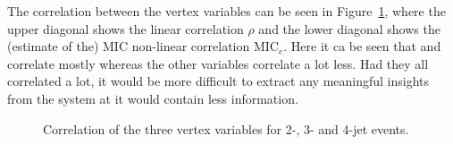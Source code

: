 The correlation between the vertex variables can be seen in Figure~\ref{fig:q:correlation_vertex_all}, where the upper diagonal shows the linear correlation $\rho$ and the lower diagonal shows the (estimate of the) MIC non-linear correlation $\mathrm{MIC}_e$. Here it ca be seen that  and  correlate mostly whereas the other variables correlate a lot less. Had they all correlated a lot, it would be more difficult to extract any meaningful insights from the system at it would contain less information. 

\begin{figure}%
  \centering
  \;
  \caption[Correlation of Vertex Variables]{Correlation of the three vertex variables for 2-, 3- and 4-jet events.}%
  \label{fig:q:correlation_vertex_all}%
\end{figure}
\vspace{0.5cm}

